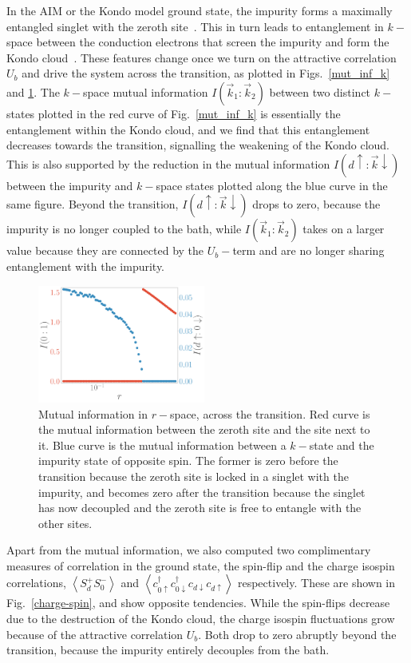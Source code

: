 \documentclass[reprint,superscriptaddress,floatfix]{revtex4-2}
\begin{document}
In the AIM or the Kondo model ground state, the impurity forms a maximally entangled singlet with the zeroth site~\cite{wilson1975,hewson1993,hrk_wilson_1980}.
This in turn leads to entanglement in \(k-\)space between the conduction electrons that screen the impurity and form the Kondo cloud~\cite{anirban_kondo}.
These features change once we turn on the attractive correlation \(U_b\) and drive the system across the transition, as plotted in Figs.~\ref{mut_inf_k} and \ref{mut_inf_r}.
The \(k-\)space mutual information \(I(\vec k_1:\vec k_2)\) between two distinct \(k-\)states plotted in the red curve of Fig.~\ref{mut_inf_k} is essentially the entanglement within the Kondo cloud, and we find that this entanglement decreases towards the transition, signalling the weakening of the Kondo cloud.
This is also supported by the reduction in the mutual information \(I(d \uparrow: \vec k \downarrow)\) between the impurity and \(k-\)space states plotted along the blue curve in the same figure. Beyond the transition, \(I(d \uparrow: \vec k \downarrow)\) drops to zero, because the impurity is no longer coupled to the bath, while \(I(\vec k_1:\vec k_2)\) takes on a larger value because they are connected by the \(U_b-\)term and are no longer sharing entanglement with the impurity.

\begin{figure}[!htb]
\includegraphics[width=0.49\textwidth]{I_r.pdf}
\caption{Mutual information in \(r-\)space, across the transition. Red curve is the mutual information between the zeroth site and the site next to it. Blue curve is the mutual information between a \(k-\)state and the impurity state of opposite spin. The former is zero before the transition because the zeroth site is locked in a singlet with the impurity, and becomes zero after  the transition because the singlet has now decoupled and the zeroth site is free to entangle with the other sites.}
\label{mut_inf_r}
\end{figure}

{\color{blue}Apart from the mutual information, we also computed two complimentary measures of correlation in the ground state, the spin-flip and the charge isospin correlations, \(\left<S_d^+ S_0^- \right>\) and \(\left<c^\dagger_{ 0 \uparrow} c^\dagger_{0 \downarrow} c_{d \downarrow} c_{d \uparrow} \right>\) respectively. These are shown in Fig.~\ref{charge-spin}, and show opposite tendencies. While the spin-flips decrease due to the destruction of the Kondo cloud, the charge isospin fluctuations grow because of the attractive correlation \(U_b\). Both drop to zero abruptly beyond the transition, because the impurity entirely decouples from the bath.}
\end{document}
